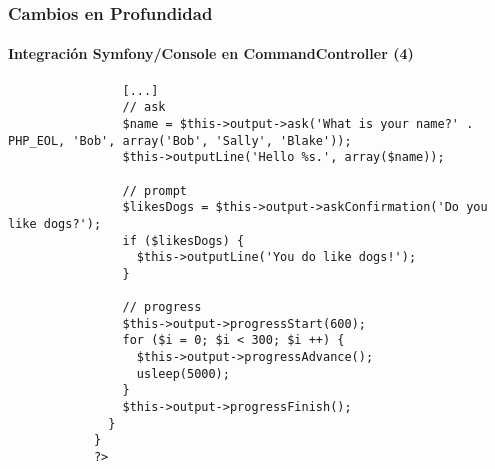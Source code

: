 
\begin{frame}[fragile]
	\frametitle{Cambios en Profundidad}
	\framesubtitle{Integración Symfony/Console en CommandController (4)}

	\lstset{basicstyle=\tiny\ttfamily}

		\begin{lstlisting}
			    [...]
			    // ask
			    $name = $this->output->ask('What is your name?' . PHP_EOL, 'Bob', array('Bob', 'Sally', 'Blake'));
			    $this->outputLine('Hello %s.', array($name));

			    // prompt
			    $likesDogs = $this->output->askConfirmation('Do you like dogs?');
			    if ($likesDogs) {
			      $this->outputLine('You do like dogs!');
			    }

			    // progress
			    $this->output->progressStart(600);
			    for ($i = 0; $i < 300; $i ++) {
			      $this->output->progressAdvance();
			      usleep(5000);
			    }
			    $this->output->progressFinish();
			  }
			}
			?>
		\end{lstlisting}

\end{frame}


